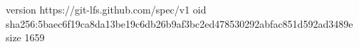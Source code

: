version https://git-lfs.github.com/spec/v1
oid sha256:5baec6f19ca8da13be19c6db26b9af3bc2ed478530292abfac851d592ad3489e
size 1659
